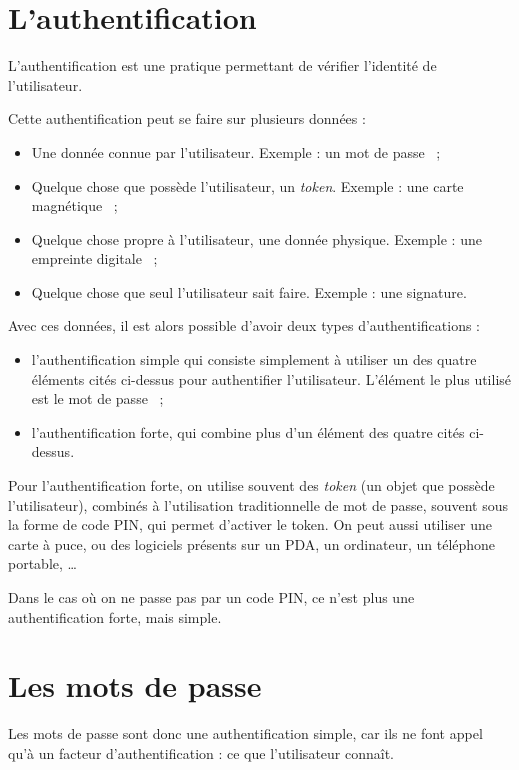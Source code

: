 \section{L'authentification}
L'authentification est une pratique permettant de vérifier
l'identité de l'utilisateur.

Cette authentification peut se faire sur plusieurs données : 
\begin{itemize}
  \item Une donnée connue par l'utilisateur. Exemple : un mot de
passe ~;
  \item Quelque chose que possède l'utilisateur, un \emph{token}.
Exemple : une carte magnétique ~;
  \item Quelque chose propre à l'utilisateur, une donnée physique.
Exemple : une empreinte digitale ~;
  \item Quelque chose que seul l'utilisateur sait faire. Exemple :
une signature.
\end{itemize}

Avec ces données, il est alors possible d'avoir deux types
d'authentifications : 
\begin{itemize}
  \item l'authentification simple qui consiste simplement à
utiliser un des quatre éléments cités ci-dessus pour authentifier
l'utilisateur. L'élément le plus utilisé est le mot de passe ~;
  \item l'authentification forte, qui combine plus d'un élément
des quatre cités ci-dessus.
\end{itemize}

Pour l'authentification forte, on utilise souvent des
\emph{token} (un objet que possède l'utilisateur), 
combinés à l'utilisation traditionnelle de mot de passe, souvent
sous la forme de code PIN, qui permet d'activer le token.
On peut aussi utiliser une carte à puce, ou des logiciels présents
sur un PDA, un ordinateur, un téléphone portable, …

Dans le cas où on ne passe pas par un code PIN, ce n'est plus une
authentification forte, mais simple.

\section{Les mots de passe}
Les mots de passe sont donc une authentification simple, car ils
ne font appel qu'à un facteur d'authentification : ce que
l'utilisateur connaît. 

